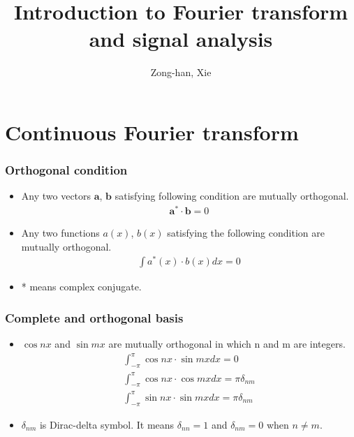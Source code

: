 \documentclass{beamer}
\title{Introduction to Fourier transform and signal analysis}
\author{\texorpdfstring{Zong-han, Xie}{Zong-han, Xie}}
\begin{document}
\begin{frame}
\titlepage
\end{frame}
\section{Continuous Fourier transform}
\begin{frame}
\frametitle{Orthogonal condition}
\begin{itemize}
\item Any two vectors $\mathbf{a}$, $\mathbf{b}$ satisfying following condition are mutually orthogonal. \newline
\begin{eqnarray}
\mathbf{a}^* \cdot \mathbf{b} = 0
\label{eq:ortho_vec}
\end{eqnarray}
\item Any two functions $a(x)$, $b(x)$ satisfying the following condition are mutually orthogonal. \newline
\begin{eqnarray}
\int{a^*(x)} \cdot {b(x)} dx = 0
\label{eq:ortho_func}
\end{eqnarray}
\item * means complex conjugate. \newline
\end{itemize}
\end{frame}
\begin{frame}
\frametitle{Complete and orthogonal basis}
\begin{itemize}
\item $\cos nx $ and $\sin mx$ are mutually orthogonal in which n and m are integers.
\begin{eqnarray}
\int_{-\pi}^{\pi}{\cos nx} \cdot {\sin mx} dx = 0 \nonumber \\
\int_{-\pi}^{\pi}{\cos nx} \cdot {\cos mx} dx = \pi\delta_{nm} \nonumber \\
\int_{-\pi}^{\pi}{\sin nx} \cdot {\sin mx} dx = \pi\delta_{nm}
\end{eqnarray}
\item $\delta_{nm} $ is Dirac-delta symbol. It means $\delta_{nn} = 1$ and $\delta_{nm} = 0$ when $n \neq m$.
\end{itemize}
\end{frame}
\end{document}
